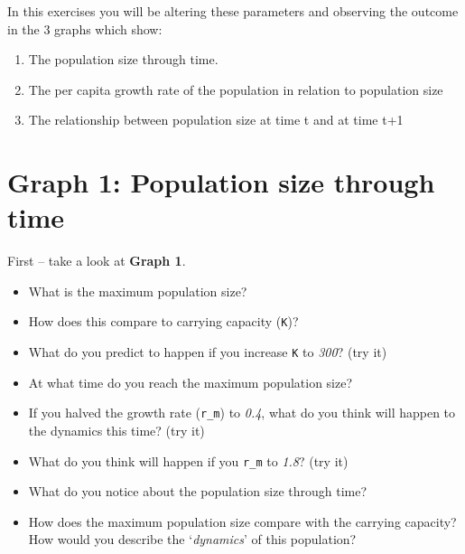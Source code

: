 \documentclass[
  a4paper]{book}
\providecommand{\tightlist}{%
  \setlength{\itemsep}{0pt}\setlength{\parskip}{0pt}}
\begin{document}
In this exercises you will be altering these parameters and observing the outcome in the 3 graphs which show:

\begin{enumerate}
\def\labelenumi{\arabic{enumi}.}
\tightlist
\item
  The population size through time.
\item
  The per capita growth rate of the population in relation to population size
\item
  The relationship between population size at time t and at time t+1
\end{enumerate}

\hypertarget{graph-1-population-size-through-time}{%
\section{Graph 1: Population size through time}\label{graph-1-population-size-through-time}}

First -- take a look at \textbf{Graph 1}.

\begin{itemize}
\tightlist
\item
  What is the maximum population size?
\item
  How does this compare to carrying capacity (\texttt{K})?
\item
  What do you predict to happen if you increase \texttt{K} to \emph{300}? (try it)
\end{itemize}

\begin{itemize}
\tightlist
\item
  At what time do you reach the maximum population size?
\item
  If you halved the growth rate (\texttt{r\_m}) to \emph{0.4}, what do you think will happen to the dynamics this time? (try it)
\end{itemize}

\begin{itemize}
\tightlist
\item
  What do you think will happen if you \texttt{r\_m} to \emph{1.8}? (try it)
\item
  What do you notice about the population size through time?
\item
  How does the maximum population size compare with the carrying capacity? How would you describe the `\emph{dynamics}' of this population?
\end{itemize}
\end{document}
